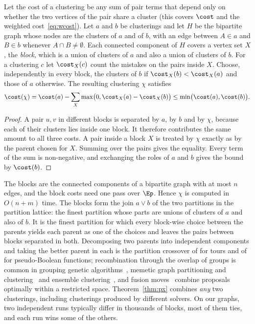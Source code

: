\begin{theorem}\label{thm:px}
Let the cost of a clustering be any sum of pair terms that depend only on
whether the two vertices of the pair share a cluster (this covers $\cost$ and
the weighted cost~\eqref{eq:wcost}).  Let $a$ and $b$ be clusterings and let
$H$ be the bipartite graph whose nodes
are the clusters of $a$ and of $b$, with an edge between $A\in a$ and $B\in b$
whenever $A\cap B\ne\emptyset$.  Each connected component of $H$ covers a
vertex set $X$, the \emph{block}, which is a union of clusters of $a$ and also
a union of clusters of $b$.  For a clustering $c$ let $\cost_X(c)$ count the
mistakes on the pairs inside $X$.  Choose, independently in every block, the
clusters of $b$ if $\cost_X(b)<\cost_X(a)$ and those of $a$ otherwise.  The
resulting clustering $\chi$ satisfies
\[
\cost(\chi)=\cost(a)-\sum_X\max\bigl(0,\cost_X(a)-\cost_X(b)\bigr)
\le\min\bigl(\cost(a),\cost(b)\bigr).
\]
\end{theorem}
\begin{proof}
A pair $u,v$ in different blocks is separated by $a$, by $b$ and by $\chi$,
because each of their clusters lies inside one block.  It therefore
contributes the same amount to all three costs.  A pair inside a block $X$ is
treated by $\chi$ exactly as by the parent chosen for $X$.  Summing over the
pairs gives the equality.  Every term of the sum is non-negative, and
exchanging the roles of $a$ and $b$ gives the bound by $\cost(b)$.
\end{proof}

The blocks are the connected components of a bipartite graph with at most $n$
edges, and the block costs need one pass over $\Ep$.  Hence $\chi$ is computed in
$O(n+m)$ time.  The blocks form the join $a\vee b$ of the two partitions in the partition
lattice: the finest partition whose parts are unions of clusters of $a$ and
also of $b$.  It is the finest partition for which every block-wise choice
between the parents yields each parent as one of the choices and leaves the
pairs between blocks separated in both.  Decomposing two parents into independent components and taking the better
parent in each is the partition crossover of
\citet{WhitleyHH09gpx,WhitleyHH10hybrid,TinosWO20gpx2} for tours and of
\citet{TinosWC15px} for pseudo-Boolean functions; recombination through the
overlap of groups is common in grouping genetic
algorithms~\citep{Falkenauer98grouping,GalinierH99coloring}, memetic graph
partitioning and clustering~\citep{SandersS12kaffpae,BiedermannHSS18memetic}
and ensemble clustering~\citep{OvelgonneG13ensemble}, and fusion
moves~\citep{BeierHK15fusion} combine proposals optimally within a restricted
space.  Theorem~\ref{thm:px} combines \emph{any} two clusterings, including
clusterings produced by different solvers.  On our graphs, two independent runs typically differ in thousands of
blocks, most of them ties, and each run wins some of the others.

